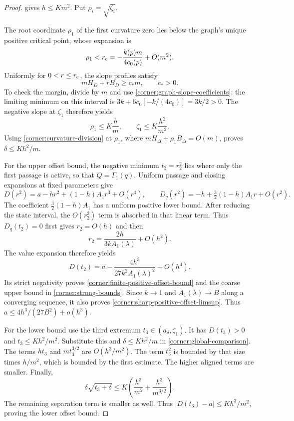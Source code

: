 \begin{proof}
\cite[Proposition~\ref*{main-sat:weighted-confinement}]{main2026} gives
\(h\le Km^2\).
Put \(\rho_i=\sqrt{\zeta_i}\).

The root coordinate $\rho_1$ of the first curvature zero lies below the
graph's unique positive critical point, whose expansion is
\[
 \rho_1<r_{\rm c}
 =-\frac{k(p)m}{4c_0(p)}+O(m^2).
\]
Uniformly for $0<r\leq r_{\rm c}$, the slope profiles satisfy
\[
 mH_D+rB_D\geq c_*m,\qquad c_*>0.
\]
To check the margin, divide by $m$ and use
\eqref{corner:graph-slope-coefficients}: the limiting minimum on this
interval is
$3k+6c_0[-k/(4c_0)]=3k/2>0$.
The negative slope at $\zeta_1$ therefore yields
\[
 \rho_1\leq K\frac hm,\qquad
 \zeta_1\leq K\frac{h^2}{m^2}.
\]
Using \eqref{corner:curvature-division} at $\rho_1$, where
$mH_\Delta+\rho_1B_\Delta=O(m)$, proves
$\delta\leq Kh^2/m$.

For the upper offset bound, the negative minimum $t_2=r_2^2$ lies
where only the first passage is active, so that $Q=\Gamma_1(q)$. Uniform
passage and closing expansions at fixed parameters give
\[
 D(r^2)=a-hr^2+(1-h)A_1r^3+O(r^4),\qquad
 D_q(r^2)=-h+\tfrac32(1-h)A_1r+O(r^2).
\]
The coefficient $\tfrac32(1-h)A_1$ has a uniform positive lower bound.
After reducing the state interval, the $O(r_2^2)$ term is absorbed in
that linear term. Thus $D_q(t_2)=0$ first gives $r_2=O(h)$ and then
\[
 r_2=\frac{2h}{3kA_1(\lambda)}+O(h^2).
\]
The value expansion therefore yields
\begin{equation}\label{corner:first-minimum-sharp}
 D(t_2)=a-\frac{4h^3}{27k^2A_1(\lambda)^2}+O(h^4).
\end{equation}
Its strict negativity proves \eqref{corner:finite-positive-offset-bound}
and the coarse upper bound in \eqref{corner:strong-bounds}.
Since $k\to1$ and $A_1(\lambda)\to B$ along a converging sequence,
it also proves \eqref{corner:sharp-positive-offset-limsup}.
Thus $a\leq4h^3/(27B^2)+o(h^3)$.

For the lower bound use the third extremum $t_3\in(a_\delta,\zeta_1)$.
It has $D(t_3)>0$ and $t_3\leq Kh^2/m^2$.  Substitute this and
$\delta\leq Kh^2/m$ in \eqref{corner:global-comparison}.
The terms $ht_3$ and $mt_3^{3/2}$ are $O(h^3/m^2)$.
The term $t_3^2$ is bounded by that size times $h/m^2$, which is
bounded by the first estimate.  The higher aligned terms are smaller.
Finally,
\[
 \delta\sqrt{t_3+\delta}
 \leq K\left(\frac{h^3}{m^2}+\frac{h^3}{m^{3/2}}\right).
\]
The remaining separation term is smaller as well. Thus
$|D(t_3)-a|\leq Kh^3/m^2$, proving the lower offset bound.

\end{proof}



